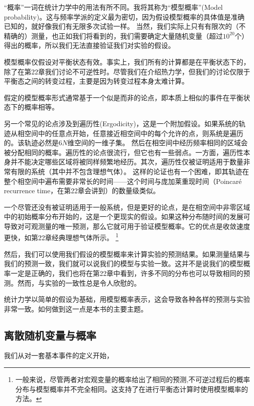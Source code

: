 \documentclass[UTF8]{ctexart}
\numberwithin{equation}{section}%
\numberwithin{figure}{section}%
\begin{document}
    “概率”一词在统计力学中的用法有所不同。我将其称为“模型概率”(Model probability)。这与频率学派的定义最为密切，因为假设模型概率的具体值是准确已知的，就好像我们有无限多次试验一样。
    当然，我们实际上只有有限次的（不精确的）测量，也正如我们将看到的，我们需要确定大量随机变量（超过$10^{20}$个）得出的概率，所以我们无法直接验证我们对实验的假设。

    模型概率仅假设对平衡状态有效。事实上，我们所有的计算都是在平衡状态下的，除了在第22章我们讨论不可逆性时。尽管我们在介绍热力学，但我们的讨论仅限于平衡态之间的转变过程，主要是因为转变过程本身太难计算。

    假定的模型概率形式通常基于一个似是而非的论点，即本质上相似的事件在平衡状态下的概率相等。

    另一个常见的论点涉及到遍历性(Ergodicity)，这是一个附加假设。如果系统的轨迹从相空间中的任意点开始，任意接近相空间中的每个允许的点，则系统是遍历的。该轨迹必然是$6N$维空间的一维子集。
    然后在相空间中经历频率相同的区域会被分配相同的概率。遍历性的论点很流行，但它也有一些弱点。一方面，遍历性本身并不能决定哪些区域将被同样频繁地经历。其次，遍历性仅被证明适用于数量非常有限的系统（其中并不包含理想气体）。
    这样的论证也有一个困难，即其轨迹在整个相空间中遍布需要非常长的时间——这个时间与庞加莱重现时间（Poincaré recurrence time，在第22章会讲到）的数量级类似。
    
    一个尽管还没有被证明适用于一般系统，但是更好的论点，是在相空间中非零区域中的初始概率分布开始的，这是一个更现实的假设。如果这种分布随时间的发展可导致对可观测量的唯一预测，那么它就可用于验证模型概率。它的优点是收敛速度更快，如第22章经典理想气体所示。
    \footnote{一般来说，尽管两者对宏观变量的概率给出了相同的预测,不可逆过程后的概率分布与模型概率并不完全相同。这支持了在进行平衡态计算时使用模型概率的方法。}

    然后，我们可以使用我们假设的模型概率来计算实验的预测结果。如果测量结果与我们的预测一致，我们就可以说我们的模型与实验一致。这并不是说我们的模型概率一定是正确的，我们也将在第22章中看到，许多不同的分布也可以导致相同的预测。然而，与实验的一致性总是令人欣慰的。
    
    统计力学以简单的假设为基础，用模型概率表示，这会导致各种各样的预测与实验非常一致。如何做到这一点是本书的主要主题。

    \subsection{离散随机变量与概率}

    我们从对一套基本事件的定义开始，
\end{document}
